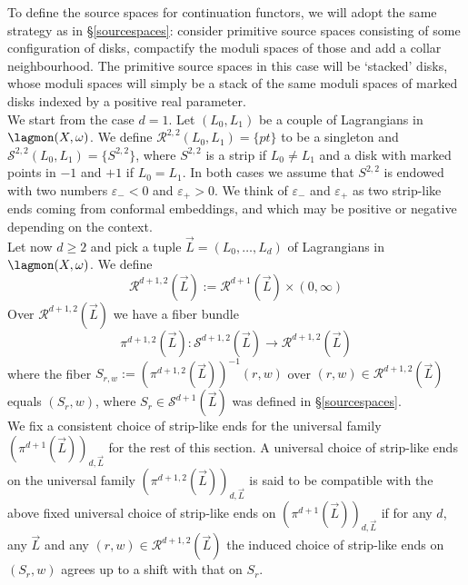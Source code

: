 	To define the source spaces for continuation functors, we will adopt the same strategy as in \S \ref{sourcespaces}: consider primitive source spaces consisting of some configuration of disks, compactify the moduli spaces of those and add a collar neighbourhood. The primitive source spaces in this case will be `stacked' disks, whose moduli spaces will simply be a stack of the same moduli spaces of marked disks indexed by a positive real parameter.\\
	We start from the case $d=1$. Let $(L_0,L_1)$ be a couple of Lagrangians in $\lagmon(X,\omega)$. We define $\mathcal{R}^{2,2}(L_0,L_1) = \{pt\}$ to be a singleton and $\mathcal{S}^{2,2}(L_0,L_1) = \{S^{2,2}\}$, where $S^{2,2}$ is a strip if $L_0\neq L_1$ and a disk with marked points in $-1$ and $+1$ if $L_0=L_1$. In both cases we assume that $S^{2,2}$ is endowed with two numbers $\varepsilon_-<0$ and $\varepsilon_+>0$. We think of $\varepsilon_-$ and $\varepsilon_+$ as two strip-like ends coming from conformal embeddings, and which may be positive or negative depending on the context.\\
	Let now $d\geq 2$ and pick a tuple $\vec{L}=(L_0,\ldots,L_d)$ of Lagrangians in $\lagmon(X,\omega)$. We define $$\mathcal{R}^{d+1,2}(\vec{L}):=\mathcal{R}^{d+1}(\vec{L})\times (0,\infty)$$ Over $\mathcal{R}^{d+1,2}(\vec{L})$ we have a fiber bundle $$\pi^{d+1,2}(\vec{L})\colon \mathcal{S}^{d+1,2}(\vec{L})\to \mathcal{R}^{d+1,2}(\vec{L})$$ where the fiber $S_{r,w}:=\left(\pi^{d+1,2}(\vec{L})\right)^{-1}(r,w)$ over $(r,w)\in \mathcal{R}^{d+1,2}(\vec{L})$ equals $(S_r,w)$, where $S_r\in \mathcal{S}^{d+1}(\vec{L})$ was defined in \S \ref{sourcespaces}.\\
	We fix a consistent choice of strip-like ends for the universal family $(\pi^{d+1}(\vec{L}))_{d,\vec{L}}$ for the rest of this section. A universal choice of strip-like ends on the universal family $(\pi^{d+1,2}(\vec{L}))_{d,\vec{L}}$ is said to be compatible with the above fixed universal choice of strip-like ends on $(\pi^{d+1}(\vec{L}))_{d,\vec{L}}$ if for any $d$, any $\vec{L}$ and any $(r,w)\in \mathcal{R}^{d+1,2}(\vec{L})$ the induced choice of strip-like ends on $(S_r,w)$ agrees up to a shift with that on $S_r$.\\
	

